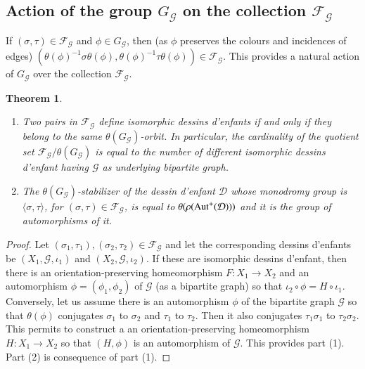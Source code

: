 \documentclass[12pt]{amsart}
\newtheorem{theo}{Theorem}
\theoremstyle{remark}
\begin{document}
\subsection{Action of the group $G_{\mathcal G}$ on the collection ${\mathcal F}_{\mathcal G}$}
If $(\sigma,\tau) \in {\mathcal F}_{\mathcal G}$ and $\phi \in G_{\mathcal G}$, then  (as $\phi$ preserves the colours and incidences of edges) $\left(\theta(\phi)^{-1} \sigma \theta(\phi), \theta(\phi)^{-1} \tau \theta(\phi)\right) \in {\mathcal F}_{\mathcal G}$. This provides a natural action of $G_{\mathcal G}$ over the collection ${\mathcal F}_{\mathcal G}$.

{\vspace{0.3cm}}
\noindent
\begin{theo}\label{teomain}
\begin{enumerate}
\item Two pairs in ${\mathcal F}_{\mathcal G}$ define isomorphic dessins d'enfants if and only if they belong to the same $\theta(G_{\mathcal G})$-orbit. In particular, the cardinality of the quotient set ${\mathcal F}_{\mathcal G}/\theta(G_{\mathcal G})$ is equal to the number of different isomorphic dessins d'enfant having ${\mathcal G}$ as underlying bipartite graph. 

\item The $\theta(G_{\mathcal G})$-stabilizer of the dessin d'enfant ${\mathcal D}$ whose monodromy group is $\langle \sigma, \tau\rangle$, for  $(\sigma,\tau) \in {\mathcal F}_{\mathcal G}$, is equal to $\theta(\rho({\rm Aut}^{+}({\mathcal D})))$ and it is the group of automorphisms of it.
\end{enumerate}
\end{theo}
\begin{proof}
Let $(\sigma_{1},\tau_{1}), (\sigma_{2},\tau_{2}) \in {\mathcal F}_{\mathcal G}$ and let the corresponding dessins d'enfants be 
$(X_{1},{\mathcal G},\iota_{1})$ and $(X_{2},{\mathcal G},\iota_{2})$. If these are isomorphic dessins d'enfant, then there is an orientation-preserving  homeomorphism $F:X_{1} \to X_{2}$ and an automorphism $\phi=(\phi_{1},\phi_{2})$ of ${\mathcal G}$ (as a bipartite graph) so that $\iota_{2} \circ\phi = H \circ \iota_{1}$. Conversely, let us assume there is an automorphism $\phi$ of the bipartite graph ${\mathcal G}$ so that $\theta(\phi)$ conjugates $\sigma_{1}$ to $\sigma_{2}$ and $\tau_{1}$ to $\tau_{2}$. Then it also conjugates $\tau_{1}\sigma_{1}$ to $\tau_{2}\sigma_{2}$. This permits to construct a an orientation-preserving homeomorphism $H:X_{1} \to X_{2}$ so that $(H,\phi)$ is an automorphism of ${\mathcal G}$. This provides part (1). Part (2) is consequence of part (1).
\end{proof}
\end{document}
